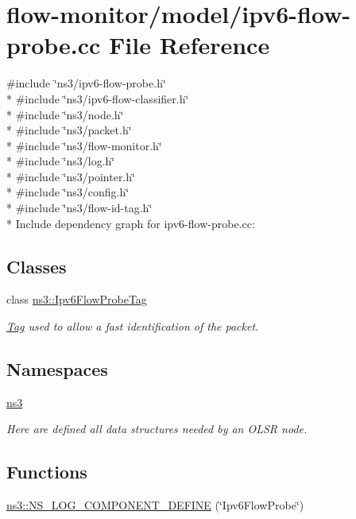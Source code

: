 \hypertarget{ipv6-flow-probe_8cc}{}\section{flow-\/monitor/model/ipv6-\/flow-\/probe.cc File Reference}
\label{ipv6-flow-probe_8cc}
{\ttfamily \#include \char`\"{}ns3/ipv6-\/flow-\/probe.\+h\char`\"{}}\\*
{\ttfamily \#include \char`\"{}ns3/ipv6-\/flow-\/classifier.\+h\char`\"{}}\\*
{\ttfamily \#include \char`\"{}ns3/node.\+h\char`\"{}}\\*
{\ttfamily \#include \char`\"{}ns3/packet.\+h\char`\"{}}\\*
{\ttfamily \#include \char`\"{}ns3/flow-\/monitor.\+h\char`\"{}}\\*
{\ttfamily \#include \char`\"{}ns3/log.\+h\char`\"{}}\\*
{\ttfamily \#include \char`\"{}ns3/pointer.\+h\char`\"{}}\\*
{\ttfamily \#include \char`\"{}ns3/config.\+h\char`\"{}}\\*
{\ttfamily \#include \char`\"{}ns3/flow-\/id-\/tag.\+h\char`\"{}}\\*
Include dependency graph for ipv6-\/flow-\/probe.cc\+:
\subsection*{Classes}
\begin{DoxyCompactItemize}
\item 
class \hyperlink{classns3_1_1Ipv6FlowProbeTag}{ns3\+::\+Ipv6\+Flow\+Probe\+Tag}
\begin{DoxyCompactList}\small\item\em \hyperlink{classns3_1_1Tag}{Tag} used to allow a fast identification of the packet. \end{DoxyCompactList}\end{DoxyCompactItemize}
\subsection*{Namespaces}
\begin{DoxyCompactItemize}
\item 
 \hyperlink{namespacens3}{ns3}
\begin{DoxyCompactList}\small\item\em Here are defined all data structures needed by an O\+L\+SR node. \end{DoxyCompactList}\end{DoxyCompactItemize}
\subsection*{Functions}
\begin{DoxyCompactItemize}
\item 
\hyperlink{namespacens3_a8108bbb695b2ff88f505efc93e1acdd7}{ns3\+::\+N\+S\+\_\+\+L\+O\+G\+\_\+\+C\+O\+M\+P\+O\+N\+E\+N\+T\+\_\+\+D\+E\+F\+I\+NE} (\char`\"{}Ipv6\+Flow\+Probe\char`\"{})
\end{DoxyCompactItemize}
